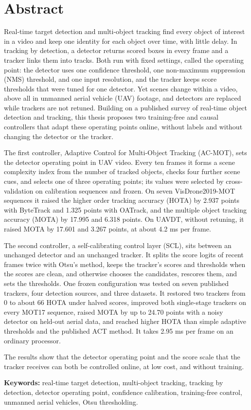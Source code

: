 \chapter*{Abstract}

Real-time target detection and multi-object tracking find every object of interest in a video and keep one identity for each object over time, with little delay. In tracking by detection, a detector returns scored boxes in every frame and a tracker links them into tracks. Both run with fixed settings, called the operating point: the detector uses one confidence threshold, one non-maximum suppression (NMS) threshold, and one input resolution, and the tracker keeps score thresholds that were tuned for one detector. Yet scenes change within a video, above all in unmanned aerial vehicle (UAV) footage, and detectors are replaced while trackers are not retuned. Building on a published survey of real-time object detection and tracking, this thesis proposes two training-free and causal controllers that adapt these operating points online, without labels and without changing the detector or the tracker.

The first controller, Adaptive Control for Multi-Object Tracking (AC-MOT), sets the detector operating point in UAV video. Every ten frames it forms a scene complexity index from the number of tracked objects, checks four further scene cues, and selects one of three operating points; its values were selected by cross-validation on calibration sequences and frozen. On seven VisDrone2019-MOT sequences it raised the higher order tracking accuracy (HOTA) by 2.937 points with ByteTrack and 1.325 points with OATrack, and the multiple object tracking accuracy (MOTA) by 17.995 and 6.318 points. On UAVDT, without retuning, it raised MOTA by 17.601 and 3.267 points, at about 4.2 ms per frame.

The second controller, a self-calibrating control layer (SCL), sits between an unchanged detector and an unchanged tracker. It splits the score logits of recent frames twice with Otsu's method, keeps the tracker's scores and thresholds when the scores are clean, and otherwise chooses the candidates, rescores them, and sets the thresholds. One frozen configuration was tested on seven published trackers, four detection sources, and three datasets. It restored two trackers from 0 to about 66 HOTA under halved scores, improved both single-stage trackers on every MOT17 sequence, raised MOTA by up to 24.70 points with a noisy detector on held-out aerial data, and reached higher HOTA than simple adaptive thresholds and the published ACT method. It takes 2.95 ms per frame on an ordinary processor.

The results show that the detector operating point and the score scale that the tracker receives can both be controlled online, at low cost, and without training.

\vspace{0.5cm}
\noindent\textbf{Keywords:} real-time target detection, multi-object tracking, tracking by detection, detector operating point, confidence calibration, training-free control, unmanned aerial vehicles, Otsu thresholding.
